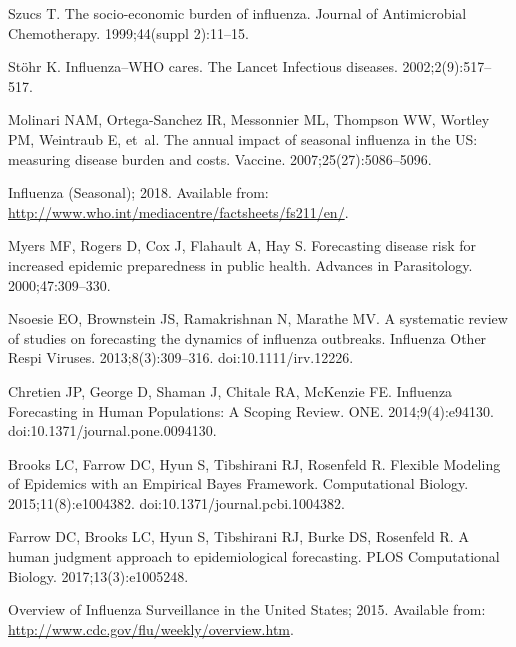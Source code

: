 \documentclass[10pt,letterpaper]{article}
\begin{document}
\begin{thebibliography}{10}

Szucs T.
\newblock The socio-economic burden of influenza.
\newblock Journal of Antimicrobial Chemotherapy. 1999;44(suppl 2):11--15.

St{\"o}hr K.
\newblock Influenza--WHO cares.
\newblock The Lancet Infectious diseases. 2002;2(9):517--517.

Molinari NAM, Ortega-Sanchez IR, Messonnier ML, Thompson WW, Wortley PM,
  Weintraub E, et~al.
\newblock The annual impact of seasonal influenza in the US: measuring disease
  burden and costs.
\newblock Vaccine. 2007;25(27):5086--5096.

Influenza (Seasonal); 2018.
\newblock Available from:
  \url{http://www.who.int/mediacentre/factsheets/fs211/en/}.

Myers MF, Rogers D, Cox J, Flahault A, Hay S.
\newblock Forecasting disease risk for increased epidemic preparedness in
  public health.
\newblock Advances in Parasitology. 2000;47:309--330.

Nsoesie EO, Brownstein JS, Ramakrishnan N, Marathe MV.
\newblock A systematic review of studies on forecasting the dynamics of
  influenza outbreaks.
\newblock Influenza Other Respi Viruses. 2013;8(3):309--316.
\newblock doi:{10.1111/irv.12226}.

Chretien JP, George D, Shaman J, Chitale RA, McKenzie FE.
\newblock Influenza Forecasting in Human Populations: A Scoping Review.
 {ONE}. 2014;9(4):e94130.
\newblock doi:{10.1371/journal.pone.0094130}.

Brooks LC, Farrow DC, Hyun S, Tibshirani RJ, Rosenfeld R.
\newblock Flexible Modeling of Epidemics with an Empirical Bayes Framework.
 Computational Biology. 2015;11(8):e1004382.
\newblock doi:{10.1371/journal.pcbi.1004382}.

Farrow DC, Brooks LC, Hyun S, Tibshirani RJ, Burke DS, Rosenfeld R.
\newblock A human judgment approach to epidemiological forecasting.
\newblock PLOS Computational Biology. 2017;13(3):e1005248.

Overview of Influenza Surveillance in the United States; 2015.
\newblock Available from: \url{http://www.cdc.gov/flu/weekly/overview.htm}.


\end{thebibliography}
\end{document}
